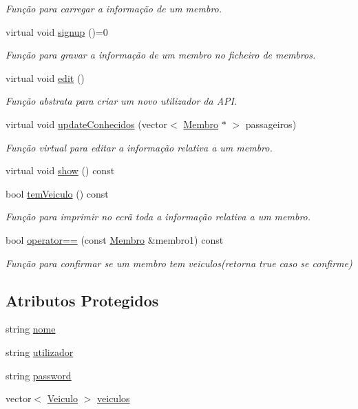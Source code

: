 \begin{DoxyCompactItemize}
\begin{DoxyCompactList}\small\item\em Função para carregar a informação de um membro. \end{DoxyCompactList}\item 
virtual void \hyperlink{class_membro_ab88b510a234c18aa035c28f4253140b3}{signup} ()=0
\begin{DoxyCompactList}\small\item\em Função para gravar a informação de um membro no ficheiro de membros. \end{DoxyCompactList}\item 
virtual void \hyperlink{class_membro_a0e4aef4dc61b9f22b277591249714452}{edit} ()
\begin{DoxyCompactList}\small\item\em Função abstrata para criar um novo utilizador da A\+P\+I. \end{DoxyCompactList}\item 
virtual void \hyperlink{class_membro_a67dab9bc0fd069a6e3204044005c197f}{update\+Conhecidos} (vector$<$ \hyperlink{class_membro}{Membro} $\ast$ $>$ passageiros)
\begin{DoxyCompactList}\small\item\em Função virtual para editar a informação relativa a um membro. \end{DoxyCompactList}\item 
virtual void \hyperlink{class_membro_a9931c13a2894a9a62760a5dddb867997}{show} () const 
\item 
bool \hyperlink{class_membro_a2d507bc34837f55b91510a86d507d8bc}{tem\+Veiculo} () const 
\begin{DoxyCompactList}\small\item\em Função para imprimir no ecrã toda a informação relativa a um membro. \end{DoxyCompactList}\item 
bool \hyperlink{class_membro_a1561028d847eead98b720c339557262c}{operator==} (const \hyperlink{class_membro}{Membro} \&membro1) const 
\begin{DoxyCompactList}\small\item\em Função para confirmar se um membro tem veiculos(retorna true caso se confirme) \end{DoxyCompactList}\end{DoxyCompactItemize}
\subsection*{Atributos Protegidos}
\begin{DoxyCompactItemize}
\item 
string \hyperlink{class_membro_a2598bbe34ae32a98f41468b2202a9555}{nome}
\item 
string \hyperlink{class_membro_a42cc733ff94ec8d1bbfdacc62dfbb0e7}{utilizador}
\item 
string \hyperlink{class_membro_ae2b12fc3e91efc674c07e735edf4ac21}{password}
\item 
vector$<$ \hyperlink{class_veiculo}{Veiculo} $>$ \hyperlink{class_membro_a7485fc8a9f992a05662866f19b22f74a}{veiculos}
\end{DoxyCompactItemize}


